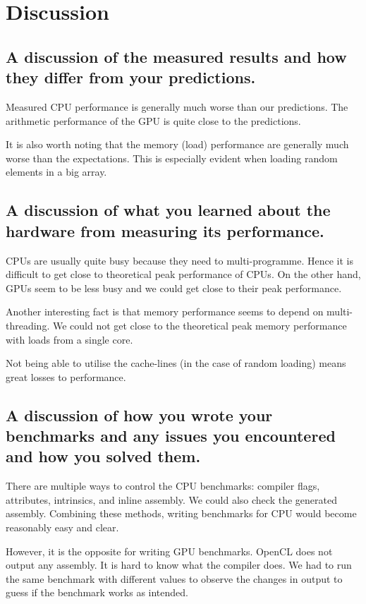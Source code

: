\documentclass{article}
\begin{document}
\section{Discussion}

\subsection{A discussion of the measured results and how they differ
  from your predictions.}
Measured CPU performance is generally much worse than our predictions.
The arithmetic performance of the GPU is quite close to the
predictions.

It is also worth noting that the memory (load) performance are
generally much worse than the expectations. This is especially evident
when loading random elements in a big array.

\subsection{A discussion of what you learned about the hardware from
  measuring its performance.}
CPUs are usually quite busy because they need to multi-programme.
Hence it is difficult to get close to theoretical peak performance of
CPUs. On the other hand, GPUs seem to be less busy and we could get
close to their peak performance.

Another interesting fact is that memory performance seems to depend on
multi-threading. We could not get close to the theoretical peak memory
performance with loads from a single core.

Not being able to utilise the cache-lines (in the case of random
loading) means great losses to performance.

\subsection{A discussion of how you wrote your benchmarks and any
  issues you encountered and how you solved them.}
There are multiple ways to control the CPU benchmarks: compiler flags,
attributes, intrinsics, and inline assembly. We could also check the
generated assembly. Combining these methods, writing benchmarks for
CPU would become reasonably easy and clear.

However, it is the opposite for writing GPU benchmarks. OpenCL does
not output any assembly. It is hard to know what the compiler does. We
had to run the same benchmark with different values to observe the
changes in output to guess if the benchmark works as intended.
\end{document}
